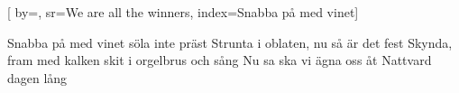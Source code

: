 

[ 		%
	by={},					%
	sr={We are all the winners},					%
	index={Snabba på med vinet}]						%
	

\beginverse*						%
Snabba på med vinet
söla inte präst
Strunta i oblaten, nu så är det fest
Skynda, fram med kalken
skit i orgelbrus och sång
Nu sa ska vi ägna oss åt Nattvard dagen lång
\endverse							%

\endsong							%